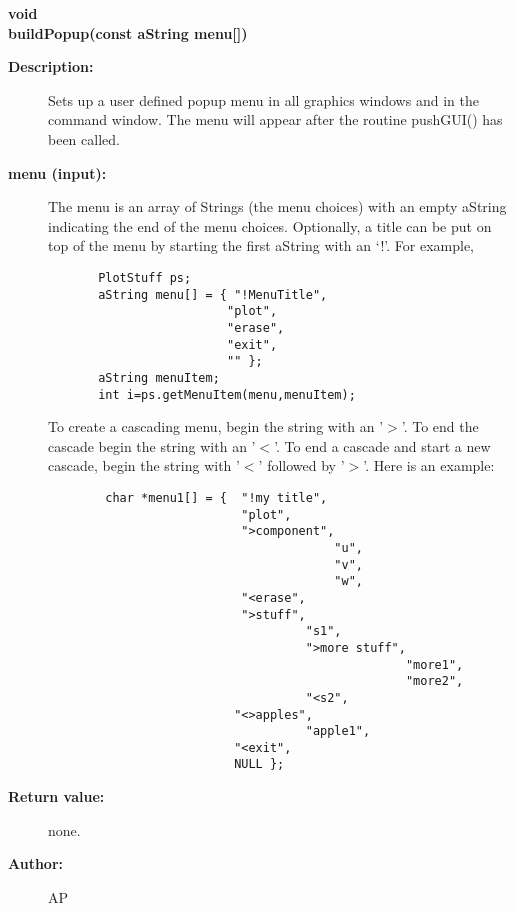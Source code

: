 \begin{flushleft} \textbf{%
void  \\ 
\settowidth{\GUIStateIncludeArgIndent}{buildPopup(}%
buildPopup(const aString menu[])
}\end{flushleft}
\begin{description}
\item[{\bf Description:}] 
    Sets up a user defined popup menu in all graphics windows and in the command window. 
    The menu will appear after the routine pushGUI() has been called.
\item[{\bf menu (input):}]  
    The {\ff menu} is
    an array of Strings (the menu choices) with an empty aString
    indicating the end of the menu choices. Optionally, a title can be put on top of the menu by 
    starting the first aString with an `!'. For example,
    \begin{verbatim}
       PlotStuff ps;
       aString menu[] = { "!MenuTitle",
                         "plot",
                         "erase",
                         "exit",
                         "" };
       aString menuItem;
       int i=ps.getMenuItem(menu,menuItem);
    \end{verbatim}

  To create a cascading menu, begin the string with an '$>$'.
  To end the cascade begin the string with an '$<$'.
  To end a cascade and start a new cascade, begin the string with '$<$' followed by '$>$'.
  Here is an example:
    \begin{verbatim}
        char *menu1[] = {  "!my title",
                           "plot",
                           ">component",
                                        "u",
                                        "v",
                                        "w",
                           "<erase",
                           ">stuff",
                                    "s1",
                                    ">more stuff", 
                                                  "more1",
                                                  "more2", 
                                    "<s2", 
                          "<>apples", 
                                    "apple1", 
                          "<exit",
                          NULL };  
    \end{verbatim}

\item[{\bf Return value:}]  none.
\item[{\bf Author:}]  AP
\end{description}
